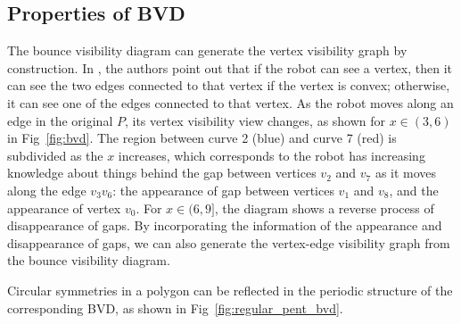 \documentclass[]{article}  %
\begin{document}
\subsection{Properties of BVD}
The bounce visibility diagram can generate the vertex visibility graph by construction. In \cite{rourke_viz}, the authors point out that if the robot can see a vertex, then it can see the two edges connected to that vertex if the vertex is convex; otherwise, it can see one of the edges connected to that vertex. As the robot moves along an edge in the original $P$, its vertex visibility view changes, as shown for $x\in (3, 6)$ in Fig~\ref{fig:bvd}. The region between curve 2 (blue) and curve 7 (red) is subdivided as the $x$ increases, which corresponds to the robot has increasing knowledge about things behind the gap between vertices $v_2$ and $v_7$ as it moves along the edge $v_3v_6$: the appearance of gap between vertices $v_1$ and $v_8$, and the appearance of vertex $v_0$. For $x\in (6, 9]$, the diagram shows a reverse process of disappearance of gaps. By incorporating the information of the appearance and disappearance of gaps, we can also generate the vertex-edge visibility graph from the bounce visibility diagram. 

Circular symmetries in a polygon can be reflected in the periodic structure of the corresponding BVD, as shown in Fig~\ref{fig:regular_pent_bvd}.
\end{document}
